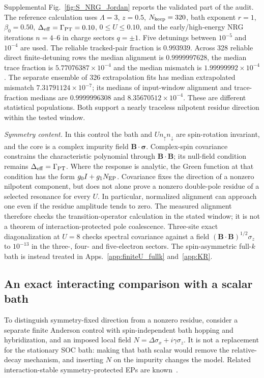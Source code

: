 \documentclass[%
  aps,physrev,onecolumn,10pt,amsmath,amssymb,superscriptaddress,longbibliography,floatfix
]{revtex4-2}
\newcommand{\Gpt}{\Gamma_{\mathrm{PT}}}   %
\newcommand{\Deff}{\Delta_{\rm eff}}     %
\begin{document}
Supplemental Fig.~\ref{fig:S_NRG_Jordan} reports the validated part of the
audit.  The reference calculation uses $\Lambda=3$, $z=0.5$, $N_{\rm keep}=320$, bath exponent $r=1$,
$\beta_0=0.50$, $\Deff=\Gpt=0.10$, $0\leq U\leq0.10$, and the
early/high-energy NRG iterations $n=4$--$6$ in charge sectors $q=\pm1$.
Five detunings between
$10^{-5}$ and $10^{-4}$ are used.  The reliable tracked-pair fraction is
$0.993939$.  Across 328 reliable direct finite-detuning rows the median
alignment is $0.9999997628$, the median trace fraction is
$5.77076387\times10^{-4}$ and the median mismatch is
$1.99999992\times10^{-4}$.  The separate ensemble of 326 extrapolation fits
has median extrapolated mismatch $7.31791124\times10^{-7}$; its medians of
input-window alignment and trace-fraction medians are $0.9999996308$ and
$8.35670512\times10^{-4}$.  These are different statistical populations.
Both support a nearly traceless nilpotent residue direction within the
tested window.

\emph{Symmetry content.}  In this control the bath and
$Un_\uparrow n_\downarrow$ are spin-rotation invariant, and the core is a
complex impurity field $\bm B\cdot\bm\sigma$.  Complex-spin covariance
constrains the characteristic polynomial through $\bm B\cdot\bm B$; its
null-field condition remains $\Deff=\Gpt$.  Where the response is analytic,
the Green function at that condition has the form $g_0I+g_1N_{\rm EP}$.
Covariance fixes the direction of a nonzero nilpotent component, but does
not alone prove a nonzero double-pole residue of a selected resonance for
every $U$.  In particular, normalized alignment can approach one even if
the residue amplitude tends to zero.  The measured alignment therefore
checks the transition-operator calculation in the stated window; it is not
a theorem of interaction-protected pole coalescence.  Three-site exact
diagonalization at $U=8$ checks spectral covariance against a field
$(\bm B\cdot\bm B)^{1/2}\sigma_z$ to $10^{-13}$ in the three-, four- and
five-electron sectors.  The spin-asymmetric full-$k$ bath is instead treated
in Apps.~\ref{app:finiteU_fullk} and~\ref{app:KR}.

\subsection{An exact interacting comparison with a scalar bath}
\label{app:exact_PT_control}
To distinguish symmetry-fixed direction from a nonzero residue, consider
a separate finite Anderson control with spin-independent bath hopping and
hybridization, and an imposed local field
$N=\Delta\sigma_x+i\gamma\sigma_z$. It is not a replacement for the
stationary SOC bath: making that bath scalar would remove the relative-decay
mechanism, and inserting $N$ on the impurity changes the model. Related
interaction-stable symmetry-protected EPs are known~\cite{Schafer2022}.
\end{document}
